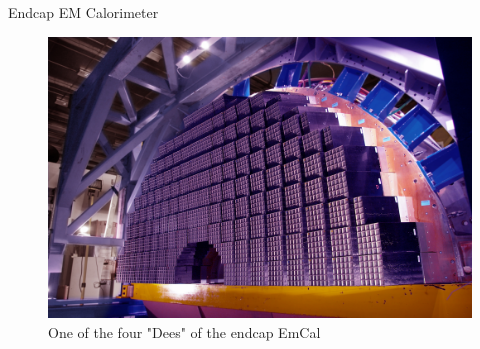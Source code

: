 \documentclass[10pt]{beamer}
\begin{document}
\begin{frame}{Endcap EM Calorimeter}
    \begin{figure}
        \centering
        \includegraphics[width=\textwidth]{./img/ecal_endcap_photo.jpg}
        \caption{One of the four "Dees" of the endcap EmCal }
        \label{fig:ecal_dees}
    \end{figure}
\end{frame}

\end{document}
